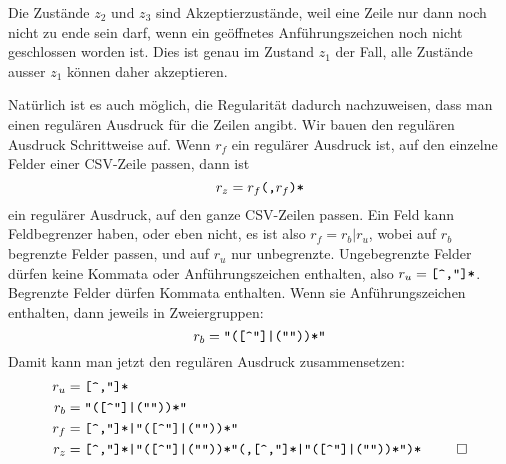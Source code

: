 \begin{loesung}
Die Zustände $z_2$ und $z_3$ sind Akzeptierzustände, weil eine Zeile
nur dann noch nicht zu ende sein darf, wenn ein geöffnetes Anführungszeichen
noch nicht geschlossen worden ist. Dies ist genau im Zustand $z_1$ der
Fall, alle Zustände ausser $z_1$ können daher akzeptieren.

Natürlich ist es auch möglich, die Regularität dadurch nachzuweisen,
dass man einen regulären Ausdruck für die Zeilen angibt. Wir bauen
den regulären Ausdruck Schrittweise auf. Wenn $r_f$ ein regulärer Ausdruck
ist, auf den einzelne Felder einer CSV-Zeile passen, dann ist
\[
r_z=r_f\text{\tt (,}r_f\text{\tt )*}
\]
ein regulärer Ausdruck, auf den ganze CSV-Zeilen passen. Ein Feld kann
Feldbegrenzer haben, oder eben nicht, es ist also $r_f=r_b|r_u$, wobei
auf $r_b$ begrenzte Felder passen, und auf $r_u$ nur unbegrenzte.
Ungebegrenzte Felder dürfen keine Kommata oder Anführungszeichen
enthalten, also $r_u=\text{\tt [\char94,\char34]*}$. Begrenzte Felder
dürfen Kommata enthalten. Wenn sie Anführungszeichen enthalten,
dann jeweils in Zweiergruppen:
\[
r_b=\text{\tt
\char34([\char94\char34]|(\char34\char34))*\char34
}
\]
Damit kann man jetzt den regulären Ausdruck zusammensetzen:
\begin{align*}
r_u&=\text{\tt
[\char94,\char34]*
}\\
r_b&=\text{\tt
\char34([\char94\char34]|(\char34\char34))*\char34
}\\
r_f&=\text{\tt
[\char94,\char34]*|\char34([\char94\char34]|(\char34\char34))*\char34
}\\
r_z&=\text{\tt
[\char94,\char34]*|\char34([\char94\char34]|(\char34\char34))*\char34
(,%
[\char94,\char34]*|\char34([\char94\char34]|(\char34\char34))*\char34
)*
}
\qedhere
\end{align*}
\end{loesung}
